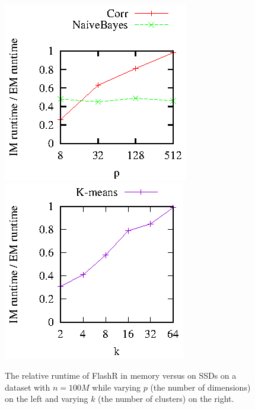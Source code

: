 \begin{figure}[t]
	\begin{center}
		\footnotesize
		\includegraphics{FlashMatrix_figs/IM-vs-EM-stat.eps}
		\includegraphics{FlashMatrix_figs/IM-vs-EM-clust.eps}
		\vspace{-10pt}
		\caption{The relative runtime of FlashR in memory versus on SSDs
		on a dataset with $n=100M$ while varying $p$ (the number of dimensions)
		on the left and varying $k$ (the number of clusters) on the right.}
		\label{perf:stat}
	\end{center}
  \vspace{-15pt}
\end{figure}

